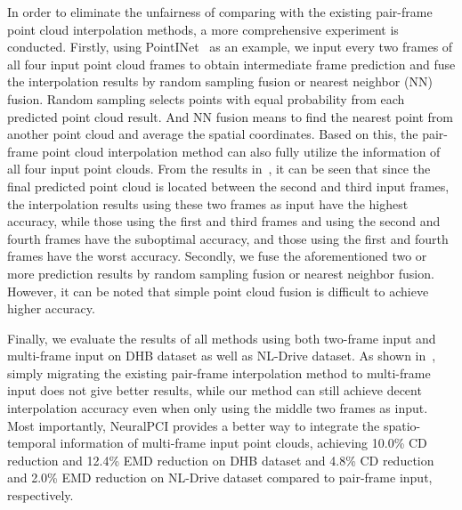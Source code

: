 \documentclass[10pt,twocolumn,letterpaper]{article}
\begin{document}
In order to eliminate the unfairness of comparing with the existing pair-frame point cloud interpolation methods, a more comprehensive experiment is conducted. Firstly, using PointINet~\cite{lu2021pointinet} as an example, we input every two frames of all four input point cloud frames to obtain intermediate frame prediction and fuse the interpolation results by random sampling fusion or nearest neighbor (NN) fusion. Random sampling selects points with equal probability from each predicted point cloud result. And NN fusion means to find the nearest point from another point cloud and average the spatial coordinates. Based on this, the pair-frame point cloud interpolation method can also fully utilize the information of all four input point clouds. From the results in~, it can be seen that since the final predicted point cloud is located between the second and third input frames, the interpolation results using these two frames as input have the highest accuracy, while those using the first and third frames and using the second and fourth frames have the suboptimal accuracy, and those using the first and fourth frames have the worst accuracy. Secondly, we fuse the aforementioned two or more prediction results by random sampling fusion or nearest neighbor fusion. However, it can be noted that simple point cloud fusion is difficult to achieve higher accuracy.

Finally, we evaluate the results of all methods using both two-frame input and multi-frame input on DHB dataset as well as NL-Drive dataset. As shown in~, simply migrating the existing pair-frame interpolation method to multi-frame input does not give better results, while our method can still achieve decent interpolation accuracy even when only using the middle two frames as input. Most importantly, NeuralPCI provides a better way to integrate the spatio-temporal information of multi-frame input point clouds, achieving 10.0\% CD reduction and 12.4\% EMD reduction on DHB dataset and 4.8\% CD reduction and 2.0\% EMD reduction on NL-Drive dataset compared to pair-frame input, respectively.
\end{document}
